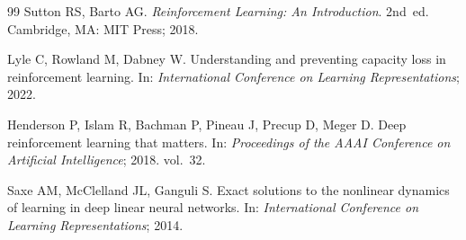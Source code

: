 \documentclass[a4paper]{article}
\begin{document}
\begin{thebibliography}{99}
Sutton RS, Barto AG.
\textit{Reinforcement Learning: An Introduction}. 2nd~ed.
Cambridge, MA: MIT Press; 2018.

Lyle C, Rowland M, Dabney W.
Understanding and preventing capacity loss in reinforcement learning.
In: \textit{International Conference on Learning Representations}; 2022.

Henderson P, Islam R, Bachman P, Pineau J, Precup D, Meger D.
Deep reinforcement learning that matters.
In: \textit{Proceedings of the AAAI Conference on Artificial Intelligence}; 2018. vol.~32.

Saxe AM, McClelland JL, Ganguli S.
Exact solutions to the nonlinear dynamics of learning in deep linear neural networks.
In: \textit{International Conference on Learning Representations}; 2014.

\end{thebibliography}
\end{document}
